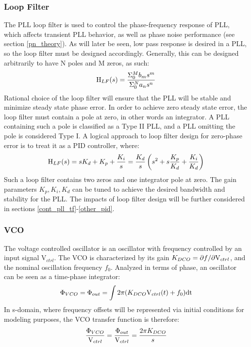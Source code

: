 \subsubsection{Loop Filter}
The PLL loop filter is used to control the phase-frequency response of PLL, which affects transient PLL behavior, as well as phase noise performance (see section \ref{pn_theory}). As will later be seen, low pass response is desired in a PLL, so the loop filter must be designed accordingly. Generally, this can be designed arbitrarily to have N poles and M zeros, as such:
\begin{equation}
	\textnormal{H}_{LF}(s) = \frac{\Sigma_0^M b_ms^m}{\Sigma_0^N a_ns^n}
\end{equation}
Rational choice of the loop filter will ensure that the PLL will be stable and minimize steady state phase error. In order to achieve zero steady state error, the loop filter must contain a pole at zero, in other words an integrator. A PLL containing such a pole is classified as a Type II PLL, and a PLL omitting the pole is considered Type I. A logical approach to loop filter design for zero-phase error is to treat it as a PID controller, where:
\begin{equation}
	\textnormal{H}_{LF}(s) = sK_d + K_p + \frac{K_i}{s} = \frac{K_d}{s}\left(s^2 + s\frac{K_p}{K_d} + \frac{K_i}{K_d}\right)
\end{equation}
Such a loop filter contains two zeros and one integrator pole at zero. The gain parameters $K_p, K_i, K_d$ can be tuned to achieve the desired bandwidth and stability for the PLL. The impacts of loop filter design will be further considered in sections \ref{cont_pll_tf}-\ref{other_pid}.
\subsubsection{VCO}
The voltage controlled oscillator is an oscillator with frequency controlled by an input signal V$_{ctrl}$. The VCO is characterized by its gain $K_{DCO} = \partial f/\partial \textnormal{V}_{ctrl}$, and the nominal oscillation frequency $f_0$. Analyzed in terms of phase, an oscillator can be seen as a time-phase integrator:
\begin{equation}
\Phi_{VCO} = \Phi_{out} = \int2\pi(K_{DCO}\textnormal{V}_{ctrl}(t) + f_0)\mathrm{dt}
\end{equation}
In s-domain, where frequency offsets will be represented via initial conditions for modeling purposes, the VCO transfer function is therefore:
\begin{equation}
\frac{\Phi_{VCO}}{\textnormal{V}_{ctrl}} = \frac{\Phi_{out}}{\textnormal{V}_{ctrl}} = \frac{2\pi K_{DCO}}{s}
\end{equation}
